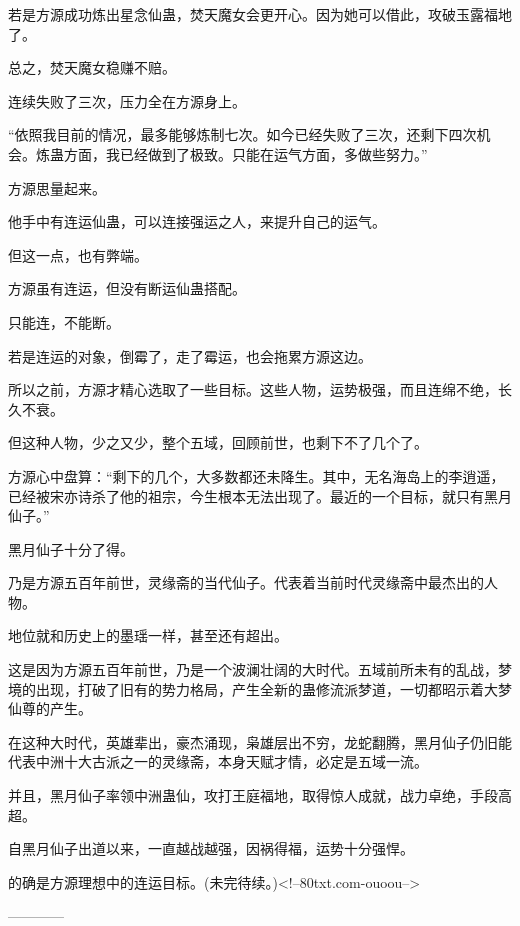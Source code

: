 \begin{this_body}
若是方源成功炼出星念仙蛊，焚天魔女会更开心。因为她可以借此，攻破玉露福地了。

总之，焚天魔女稳赚不赔。

连续失败了三次，压力全在方源身上。

“依照我目前的情况，最多能够炼制七次。如今已经失败了三次，还剩下四次机会。炼蛊方面，我已经做到了极致。只能在运气方面，多做些努力。”

方源思量起来。

他手中有连运仙蛊，可以连接强运之人，来提升自己的运气。

但这一点，也有弊端。

方源虽有连运，但没有断运仙蛊搭配。

只能连，不能断。

若是连运的对象，倒霉了，走了霉运，也会拖累方源这边。

所以之前，方源才精心选取了一些目标。这些人物，运势极强，而且连绵不绝，长久不衰。

但这种人物，少之又少，整个五域，回顾前世，也剩下不了几个了。

方源心中盘算：“剩下的几个，大多数都还未降生。其中，无名海岛上的李逍遥，已经被宋亦诗杀了他的祖宗，今生根本无法出现了。最近的一个目标，就只有黑月仙子。”

黑月仙子十分了得。

乃是方源五百年前世，灵缘斋的当代仙子。代表着当前时代灵缘斋中最杰出的人物。

地位就和历史上的墨瑶一样，甚至还有超出。

这是因为方源五百年前世，乃是一个波澜壮阔的大时代。五域前所未有的乱战，梦境的出现，打破了旧有的势力格局，产生全新的蛊修流派梦道，一切都昭示着大梦仙尊的产生。

在这种大时代，英雄辈出，豪杰涌现，枭雄层出不穷，龙蛇翻腾，黑月仙子仍旧能代表中洲十大古派之一的灵缘斋，本身天赋才情，必定是五域一流。

并且，黑月仙子率领中洲蛊仙，攻打王庭福地，取得惊人成就，战力卓绝，手段高超。

自黑月仙子出道以来，一直越战越强，因祸得福，运势十分强悍。

的确是方源理想中的连运目标。(未完待续。)<!--80txt.com-ouoou-->

------------

\end{this_body}

